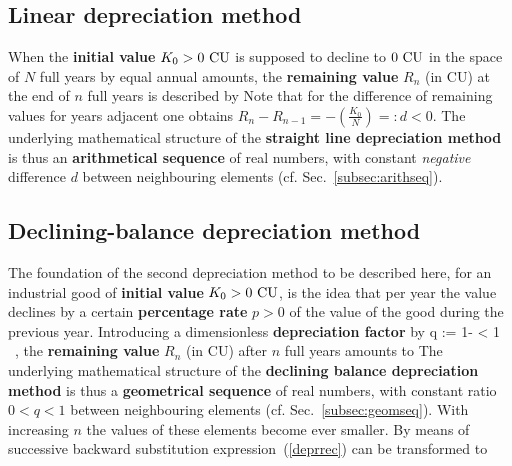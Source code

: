 \subsection{Linear depreciation method}
When the {\bf initial value} $K_{0}>0~{\rm CU}$ is supposed to 
decline to $0~{\rm CU}$ in the space of $N$ full years by equal 
annual amounts, the {\bf remaining value} $R_{n}$ (in CU) at the 
end of $n$ full years is described by
%
\be
{}
\ee
%
Note that for the difference of remaining values for years 
adjacent one obtains $\displaystyle R_{n}-R_{n-1}
= -\left(\frac{K_{0}}{N}\right) =: d < 0$. The underlying 
mathematical structure of the {\bf straight line depreciation 
method} is thus an {\bf arithmetical sequence} of real numbers, 
with constant \emph{negative} difference $d$ between neighbouring 
elements (cf. Sec.~\ref{subsec:arithseq}).

\subsection{Declining-balance depreciation method}
The foundation of the second depreciation method to be described 
here, for an industrial good of {\bf initial value} $K_{0}>0~{\rm 
CU}$, is the idea that per year the value declines by a certain 
{\bf percentage rate} $p>0$ of the value of the good during the 
previous year. Introducing a dimensionless {\bf depreciation 
factor} by
%
\be
q := 1- < 1 \ ,
\ee
%
the {\bf remaining value} $R_{n}$ (in CU) after $n$ full years 
amounts to
%
\be
{}
\ee
%
The underlying mathematical structure of the {\bf declining 
balance depreciation method} is thus a {\bf geo\-metrical 
sequence} of real numbers, with constant ratio $0<q<1$ between 
neighbouring elements (cf. Sec.~\ref{subsec:geomseq}). With 
increasing $n$ the values of these elements become ever smaller. 
By means of successive backward substitution 
expression~(\ref{deprrec}) can be transformed to
%
\be
{}
\ee
%

